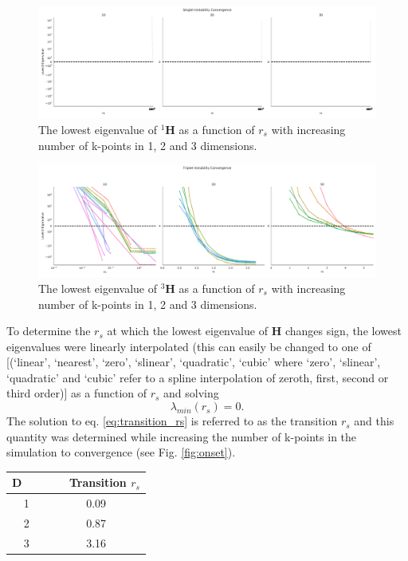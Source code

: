 \documentclass[preprint, journal=prl]{revtex4-1}
\begin{document}
  \begin{figure}
    \centering
    \includegraphics[width=\textwidth]{../../images/singlet-stability-convergence.pdf}
    \caption{The lowest eigenvalue of ${}^1\mathbf{H}$ as a function of $r_s$ with increasing number of k-points in 1, 2 and 3 dimensions.}
    \label{fig:singlet_convergence}
  \end{figure}
  \begin{figure}
    \centering
    \includegraphics[width=\textwidth]{../../images/triplet-stability-convergence.pdf}
    \caption{The lowest eigenvalue of ${}^3\mathbf{H}$ as a function of $r_s$ with increasing number of k-points in 1, 2 and 3 dimensions.}
    \label{fig:triplet_convergence}
  \end{figure}
  To determine the $r_s$ at which the lowest eigenvalue of $\mathbf{H}$ changes sign, the lowest eigenvalues were linearly interpolated  {\color{red} (this can easily be changed to one of [(‘linear’, ‘nearest’, ‘zero’, ‘slinear’, ‘quadratic’, ‘cubic’ where ‘zero’, ‘slinear’, ‘quadratic’ and ‘cubic’ refer to a spline interpolation of zeroth, first, second or third order)]} as a function of $r_s$ and solving
  \begin{equation} \label{eq:transition_rs}
    \lambda_{min}(r_s) = 0.
  \end{equation}
  The solution to eq. \ref{eq:transition_rs} is referred to as the transition $r_s$ and this quantity was determined while increasing the number of k-points in the simulation to convergence (see Fig. \ref{fig:onset}).
  
  \begin{tabular}{c | c }\label{table:transition_rs}
    D~~~ & ~~ Transition $r_s$ \\
    \hline
    1    &  0.09 \\
    2    &  0.87 \\
    3    &  3.16 \\
    \hline
  \end{tabular}
  
\end{document}
